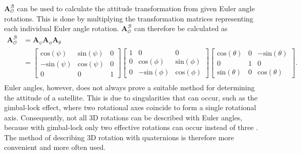 $\boldsymbol{A}^{\mathcal{B}}_{\mathcal{O}}$ can be used to calculate the attitude transformation from given Euler angle rotations. This is done by multiplying the transformation matrices representing each individual Euler angle rotation. $\boldsymbol{A}^{\mathcal{B}}_{\mathcal{O}}$ can therefore be calculated as 
\begin{equation}
	\begin{aligned}
		\boldsymbol{A}^{\mathcal{B}}_{\mathcal{O}} &= \boldsymbol{A}_{\psi} \boldsymbol{A}_{\phi} \boldsymbol{A}_{\theta} \\
			&= \begin{bmatrix}
			\text{cos}(\psi) & \text{sin}(\psi) & 0 \\
			-\text{sin}(\psi) & \text{cos}(\psi) & 0 \\
			0 & 0 & 1
			\end{bmatrix} \begin{bmatrix}
			1 & 0 & 0 \\
			0 & \text{cos}(\phi) & \text{sin}(\phi) \\
			0 & -\text{sin}(\phi) & \text{cos}(\phi)
			\end{bmatrix} \begin{bmatrix}
			\text{cos}(\theta) &  0 & -\text{sin}(\theta) \\
			0 & 1 & 0 \\
			\text{sin}(\theta) & 0 & \text{cos}(\theta)
			\end{bmatrix}. \\
	\end{aligned}
\end{equation}
Euler angles, however, does not always prove a suitable method for determining the attitude of a satellite. This is due to singularities that can occur, such as the gimbal-lock effect, where two rotational axes coincide to form a single rotational axis. Consequently, not all $3$D rotations can be described with Euler angles, because with gimbal-lock only two effective rotations can occur instead of three \cite{diebel2006representing}. The method of describing $3$D rotation with quaternions is therefore more convenient and more often used. 

